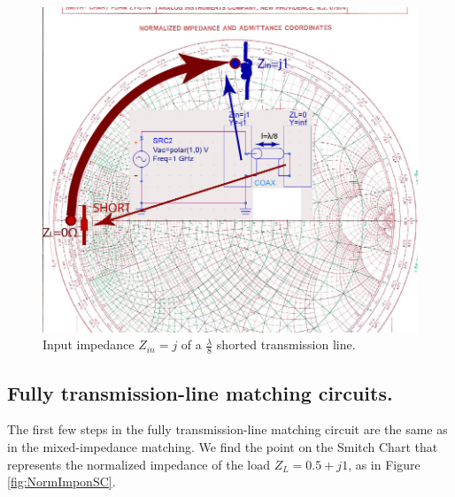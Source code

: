 \documentclass{ximera}
\begin{document}
\begin{figure}[htbp]
\begin{center}
\includegraphics[scale=1]{../jpg/shortedstub-01.jpg}
\end{center}
\caption{Input impedance $Z_{in}=j$ of a $\frac{\lambda}{8}$ shorted transmission line.}
\label{fig:ShortedStubLambdaOver8}
\end{figure}
\newpage

\subsection{Fully transmission-line matching circuits.}

The first few steps in the fully transmission-line matching circuit are the same as in the mixed-impedance matching. We find the point on the Smitch Chart that represents the normalized impedance of the load $Z_L=0.5+j1$, as in Figure \ref{fig:NormImponSC}. 
\end{document}
